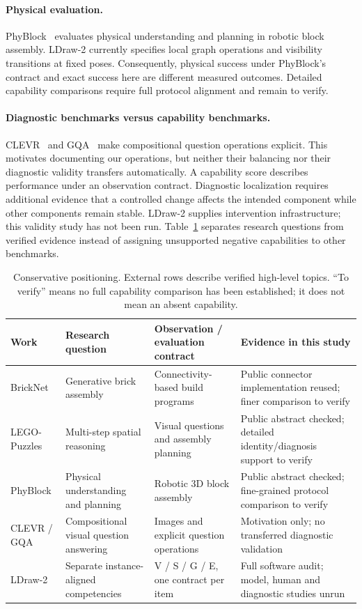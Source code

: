 \documentclass[10pt,twocolumn,letterpaper]{article}
\begin{document}
\paragraph{Physical evaluation.}
PhyBlock~\cite{ma2025phyblock} evaluates physical understanding and
planning in robotic block assembly. LDraw-2 currently specifies local
graph operations and visibility transitions at fixed poses.
Consequently, physical success under PhyBlock's contract and exact
success here are different measured outcomes. Detailed capability
comparisons require full protocol alignment and remain to verify.

\paragraph{Diagnostic benchmarks versus capability benchmarks.}
CLEVR~\cite{johnson2017clevr} and GQA~\cite{hudson2019gqa} make
compositional question operations explicit. This motivates documenting
our operations, but neither their balancing nor their diagnostic
validity transfers automatically. A capability score describes
performance under an observation contract. Diagnostic localization
requires additional evidence that a controlled change affects the
intended component while other components remain stable.
LDraw-2 supplies intervention infrastructure; this validity study has
not been run. Table~\ref{tab:related} separates research questions from
verified evidence instead of assigning unsupported negative
capabilities to other benchmarks.

\begin{table}[t]
\centering\small
\caption{Conservative positioning. External rows describe verified
high-level topics. ``To verify'' means no full capability comparison
has been established; it does not mean an absent capability.}
\label{tab:related}
\begin{tabularx}{\linewidth}{lXXX}
\toprule
Work & Research question & Observation / evaluation contract & Evidence in this study\\\midrule
BrickNet & Generative brick assembly & Connectivity-based build programs & Public connector implementation reused; finer comparison to verify\\
LEGO-Puzzles & Multi-step spatial reasoning & Visual questions and assembly planning & Public abstract checked; detailed identity/diagnosis support to verify\\
PhyBlock & Physical understanding and planning & Robotic 3D block assembly & Public abstract checked; fine-grained protocol comparison to verify\\
CLEVR / GQA & Compositional visual question answering & Images and explicit question operations & Motivation only; no transferred diagnostic validation\\
LDraw-2 & Separate instance-aligned competencies & V / S / G / E, one contract per item & Full software audit; model, human and diagnostic studies unrun\\
\bottomrule
\end{tabularx}
\end{table}
\end{document}
